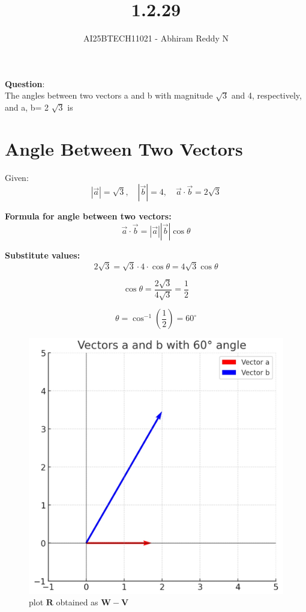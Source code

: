 \documentclass[journal]{IEEEtran}
\begin{document}

\vspace{3cm}

\title{1.2.29}
\author{AI25BTECH11021 - Abhiram Reddy N}
{\let\newpage\relax\maketitle}

\renewcommand{\thefigure}{\theenumi}
\renewcommand{\thetable}{\theenumi}
\setlength{\intextsep}{10pt} %


\renewcommand{\thetable}{\theenumi}


\textbf{Question}:\\The angles between
two vectors a and b with magnitude
$\sqrt{3}$ and 4, respectively,
and a, b= 2 $\sqrt{3}$ is


\section*{Angle Between Two Vectors}

Given:
\[
|\vec{a}| = \sqrt{3}, \quad |\vec{b}| = 4, \quad \vec{a} \cdot \vec{b} = 2\sqrt{3}
\]

\textbf{Formula for angle between two vectors:}
\[
\vec{a} \cdot \vec{b} = |\vec{a}| |\vec{b}| \cos\theta
\]

\textbf{Substitute values:}
\[
2\sqrt{3} = \sqrt{3} \cdot 4 \cdot \cos\theta = 4\sqrt{3} \cos\theta
\]

\[
\cos\theta = \frac{2\sqrt{3}}{4\sqrt{3}} = \frac{1}{2}
\]

\[
\theta = \cos^{-1}\left(\frac{1}{2}\right) = \boxed{60^\circ}
\]


\begin{figure}[htbp]
\centering
\includegraphics[width=0.8\columnwidth]{figs/python_plot.png} 
\caption{plot $\mathbf{R}$ obtained as $\mathbf{W}-\mathbf{V}$}
\label{fig:plot}
\end{figure}
\end{document}
